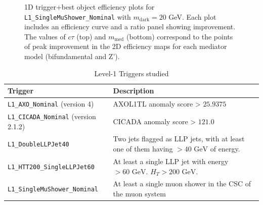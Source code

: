\begin{figure}[h]
  \caption{1D trigger+best object efficiency plots for \texttt{L1\_SingleMuShower\_Nominal} with $m_\mathrm{dark} = 20$ GeV. Each plot includes an efficiency curve and a ratio panel showing improvement. The values of $c\tau$ (top) and $m_\mathrm{med}$ (bottom) correspond to the points of peak improvement in the 2D efficiency maps for each mediator model (bifundamental and Z').}
  \label{fig:mus_eff1D}
\end{figure}


\newpage

\begin{landscape}
    \begin{table}[]
        \centering
        \begin{tabular}{ll}
            \hline
            \textbf{Trigger} & \textbf{Description}\\
            \hline
            \texttt{L1\_AXO\_Nominal} (version 4) & AXOL1TL anomaly score > $25.9375$\\
            \texttt{L1\_CICADA\_Nominal} (version 2.1.2) & CICADA anomaly score > $121.0$\\
            \texttt{L1\_DoubleLLPJet40} & Two jets flagged as LLP jets, with at least one of them having $>40 \text{ GeV}$ of energy.\\
            \texttt{L1\_HTT200\_SingleLLPJet60} & At least a single LLP jet with energy $> 60 \text{ GeV}$. $H_T >200 \text{ GeV}$.\\
            \texttt{L1\_SingleMuShower\_Nominal} & At least a single muon shower in the CSC of the muon system\\
            \hline
        \end{tabular}
        \caption{Level-1 Triggers studied}
        \label{tab:l1-trigs}
    \end{table}

\end{landscape}

